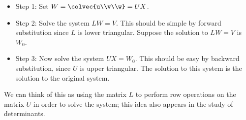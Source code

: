 \begin{itemize}
\item{Step 1:} Set $W=\colvec{u\\v\\w}=UX$.  

\item{Step 2:} Solve the system $LW=V$.  This should be simple by forward substitution since $L$ is lower triangular.  Suppose the solution to $LW=V$ is $W_0$.  

\item{Step 3:} Now solve the system $UX=W_0$.  This should be easy by backward substitution, since $U$ is upper triangular.  The solution to this system is the solution to the original system.
\end{itemize}
We can think of this as using the matrix $L$ to perform row operations on the matrix $U$ in order to solve the system; this idea also appears in the  study of determinants.


